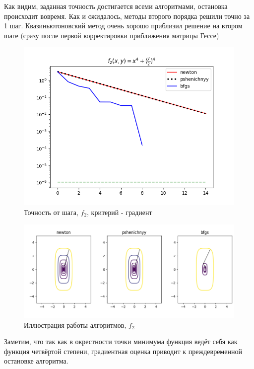 Как видим, заданная точность достигается всеми алгоритмами, остановка происходит вовремя.
Как и ожидалось, методы второго порядка решили точно за 1 шаг.
Квазиньютоновский метод очень хорошо приблизил решение на втором шаге (сразу после первой корректировки приближения матрицы Гессе)

\begin{figure}[H]
			\centering
			\includegraphics[scale=0.75]{figures/acc_from_step_func2}
			\caption{Точность от шага, $f_2$, критерий - градиент}
			\label{fig:acc_from_step_func2}
\end{figure}

\begin{figure}[H]
			\centering
			\includegraphics[scale=0.75]{figures/process_view_func2}
			\caption{Иллюстрация работы алгоритмов, $f_2$}
			\label{fig:process_view_func2}
\end{figure}

Заметим, что так как в окрестности точки минимума функция ведёт себя как функция четвёртой степени, градиентная оценка приводит к преждевременной остановке алгоритма.

